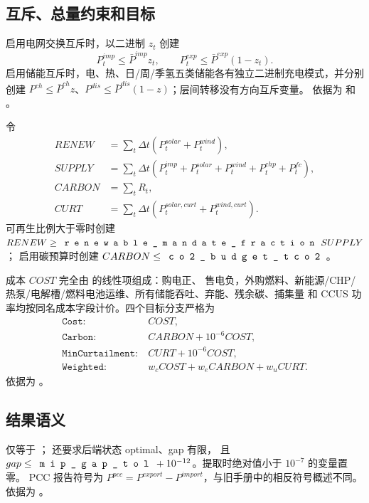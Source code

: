 \subsection{互斥、总量约束和目标}

启用电网交换互斥时，以二进制 $z_t$ 创建
\begin{equation}
 P_t^{imp}\le\bar P^{imp}z_t,\qquad P_t^{exp}\le\bar P^{exp}(1-z_t).
\end{equation}
启用储能互斥时，电、热、日/周/季氢五类储能各有独立二进制充电模式，并分别创建
$P^{ch}\le\bar P^{ch}z$、$P^{dis}\le\bar P^{dis}(1-z)$；层间转移没有方向互斥变量。
依据为  和
。

令
\begin{align}
 RENEW&=\sum_t\Delta t(P_t^{solar}+P_t^{wind}),\\
 SUPPLY&=\sum_t\Delta t(P_t^{imp}+P_t^{solar}+P_t^{wind}+P_t^{chp}+P_t^{fc}),\\
 CARBON&=\sum_tR_t,\\
 CURT&=\sum_t\Delta t(P_t^{solar,curt}+P_t^{wind,curt}).
\end{align}
可再生比例大于零时创建 $RENEW\ge\fld{renewable\_mandate\_fraction}\,SUPPLY$；
启用碳预算时创建 $CARBON\le\fld{co2\_budget\_tco2}$。

成本 $COST$ 完全由  的线性项组成：购电正、
售电负，外购燃料、新能源/CHP/热泵/电解槽/燃料电池运维、所有储能吞吐、弃能、残余碳、捕集量
和 CCUS 功率均按同名成本字段计价。四个目标分支严格为
\begin{align}
 \texttt{Cost}:&\ COST,\\
 \texttt{Carbon}:&\ CARBON+10^{-6}COST,\\
 \texttt{MinCurtailment}:&\ CURT+10^{-6}COST,\\
 \texttt{Weighted}:&\ w_cCOST+w_eCARBON+w_uCURT.
\end{align}
依据为 。

\subsection{结果语义}

 仅等于 ； 还要求后端状态 optimal、gap 有限，
且 $gap\le\fld{mip\_gap\_tol}+10^{-12}$。提取时绝对值小于 $10^{-7}$ 的变量置零。
PCC 报告符号为 $P^{pcc}=P^{export}-P^{import}$，与旧手册中的相反符号概述不同。
依据为 。
